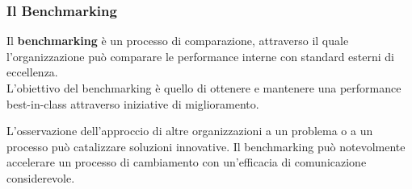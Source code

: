 \subsubsection{Il Benchmarking}\label{sub:bpr_il_benchmarking} %
Il \textbf{benchmarking} è un processo di comparazione, attraverso il quale l'organizzazione può comparare le performance interne con standard esterni di eccellenza.
\\
L'obiettivo del benchmarking è quello di ottenere e mantenere una performance best-in-class attraverso iniziative di miglioramento.
\begin{note}
    L'osservazione dell'approccio di altre organizzazioni a un problema o a un processo può catalizzare soluzioni innovative.
    Il benchmarking può notevolmente accelerare un processo di cambiamento con un'efficacia di comunicazione considerevole.
\end{note}
%
